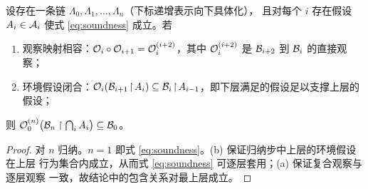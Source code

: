 \begin{proposition}[可靠性的组合条件]\label{prop:soundness}
设存在一条链 $\Lambda_0, \Lambda_1, \dots, \Lambda_n$（下标递增表示向下具体化），
且对每个 $i$ 存在假设 $A_i \in \mathcal{A}_i$ 使式 \eqref{eq:soundness} 成立。若
\begin{enumerate}[label=(\alph*)]
\item 观察映射相容：$\mathcal{O}_i \circ \mathcal{O}_{i+1} = \mathcal{O}_i^{(i+2)}$，其中
      $\mathcal{O}_i^{(i+2)}$ 是 $\mathcal{B}_{i+2}$ 到 $\mathcal{B}_i$ 的直接观察；
\item 环境假设闭合：$\mathcal{O}_i(\mathcal{B}_{i+1}\!\upharpoonright\! A_i) \subseteq
      \mathcal{B}_i \!\upharpoonright\! A_{i-1}$，即下层满足的假设足以支撑上层的假设；
\end{enumerate}
则 $\mathcal{O}_0^{(n)}\bigl(\mathcal{B}_n \upharpoonright \bigcap_i A_i\bigr) \subseteq \mathcal{B}_0$。
\end{proposition}

\begin{proof}
对 $n$ 归纳。$n=1$ 即式 \eqref{eq:soundness}。(b) 保证归纳步中上层的环境假设在上层
行为集合内成立，从而式 \eqref{eq:soundness} 可逐层套用；(a) 保证复合观察与逐层观察
一致，故结论中的包含关系对最上层成立。
\end{proof}

